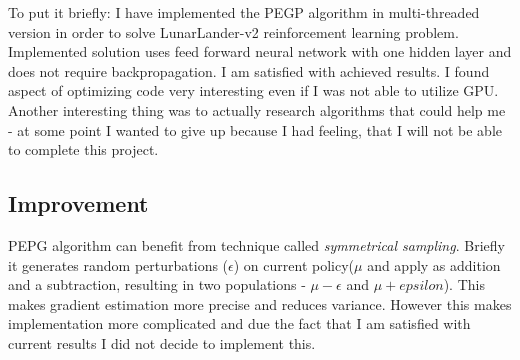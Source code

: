 \documentclass[12pt]{article}
\begin{document}
To put it briefly: I have implemented the PEGP algorithm in multi-threaded version in order to solve LunarLander-v2 reinforcement learning problem. Implemented solution uses feed forward neural network with one hidden layer and does not require backpropagation. I am satisfied with achieved results. I found aspect of optimizing code very interesting even if I was not able to utilize GPU. Another interesting thing was to actually research algorithms that could help me - at some point I wanted to give up because I had feeling, that I will not be able to complete this project.

\subsection{Improvement}

PEPG algorithm can benefit from technique called \emph{symmetrical sampling}. Briefly it generates random perturbations ($\epsilon$) on current policy($\mu$ and apply as addition and a subtraction, resulting in two populations - $\mu - \epsilon$ and $\mu + epsilon$). This makes gradient estimation more precise and reduces variance. However this makes implementation more complicated and due the fact that I am satisfied with current results I did not decide to implement this.


\newpage


 
\end{document}
